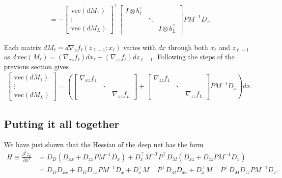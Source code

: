 \documentclass{article}
\begin{document}
\begin{align}
      & = -\begin{bmatrix}
               \mathrm{vec} \left(dM_1\right) \\
               \vdots                         \\
               \mathrm{vec} \left(dM_L\right)
           \end{bmatrix}
    ^\top
    \begin{bmatrix}
        I \otimes b_1^\top \\ &\ddots  \\ && I \otimes b_L^\top
    \end{bmatrix}
    PM^{-1} D_x.
\end{align}

Each matrix $dM_\ell = d \nabla_z f_\ell(z_{\ell-1}; x_\ell)$ varies with $dx$
through both $x_\ell$ and $z_{\ell -1}$ as $d\,\mathrm{vec} \left(M_\ell\right)
    = \left(\nabla_{xz} f_\ell\right) dx_\ell + \left(\nabla_{zz} f_\ell\right)
    dz_{\ell-1}$. Following the steps of the previous section gives
\begin{align}
    \begin{bmatrix}
        \mathrm{vec}\left(dM_1\right) \\
        \vdots                        \\
        \mathrm{vec}\left(dM_L\right)
    \end{bmatrix}
    =
    \left(
    \begin{bmatrix}
        \nabla_{xz} f_1 &        &                 \\
                        & \ddots &                 \\
                        &        & \nabla_{xz} f_L
    \end{bmatrix}
    +
    \begin{bmatrix}
        \nabla_{zz} f_1 \\ &\ddots& \\ && \nabla_{zz} f_L
    \end{bmatrix}
    P M^{-1} D_x
    \right)dx.
\end{align}

\subsection{Putting it all together}

We have just shown that the Hessian of the deep net has the form
\begin{align}
    H \equiv \frac{\partial^2 z_L}{\partial x^2}
     & = D_D \left(D_{xx} + D_{zx} PM^{-1} D_x\right) + D_x^\top M^{-T}P^\top D_M \left(D_{xz}+D_{zz}P M^{-1}D_x\right)           \\
     & = D_DD_{xx}  + D_DD_{zx} PM^{-1} D_x + D_x^\top M^{-\top}P^\top D_M D_{xz}+D_x^\top M^{-\top}P^\top D_M D_{zz}P M^{-1}D_x.
\end{align}
\end{document}
